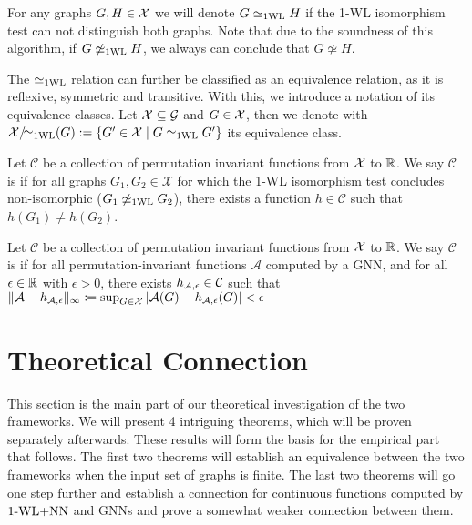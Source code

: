 \begin{definition}[1-WL Relation]
    For any graphs $G,H \in \mathcal{X}$ we will denote $G \simeq_{\text{1WL}} H$ if the 1-WL isomorphism test can not distinguish both graphs. Note that due to the soundness of this algorithm, if $G \not\simeq_{\text{1WL}} H$, we always can conclude that $G \not\simeq H$.
\end{definition}

The $\simeq_{\text{1WL}}$ relation can further be classified as an equivalence relation, as it is reflexive, symmetric and transitive. With this, we introduce a notation of its equivalence classes. Let $\mathcal{X} \subseteq \mathcal{G}$ and $G \in \mathcal{X}$, then we denote with $\mathcal{X}/\!{\simeq_{\text{1WL}}}(G): = \{ G' \in \mathcal{X} \mid G \simeq_{\text{1WL}} G' \}$ its equivalence class.

\begin{definition}[$\wldisc$]
    Let $\mathcal{C}$ be a collection of permutation invariant functions from $\mathcal{X}$ to $\mathbb{R}$. We say $\mathcal{C}$ is \textbf{\wldisc} if for all graphs $G_1, G_2 \in \mathcal{X}$ for which the 1-WL isomorphism test concludes non-isomorphic ($G_1 \not\simeq_{\text{1WL}} G_2$), there exists a function $h \in \mathcal{C}$ such that $h(G_1) \neq h(G_2)$.
\end{definition}

\begin{definition}[$\gapp$]
    Let $\mathcal{C}$ be a collection of permutation invariant functions from $\mathcal{X}$ to $\mathbb{R}$. We say $\mathcal{C}$ is \textbf{\gapp} if for all permutation-invariant functions $\mathcal{A}$ computed by a GNN, and for all $\epsilon \in \mathbb{R}$ with $\epsilon > 0$, there exists $h_{\mathcal{A},\epsilon} \in \mathcal{C}$ such that $\| \mathcal{A} - h_{\mathcal{A},\epsilon} \|_\infty \coloneqq \sup_{G \in \mathcal{X}} |\mathcal{A}(G) - h_{\mathcal{A},\epsilon}(G)| < \epsilon$
\end{definition}

\section{Theoretical Connection}\label{sec:theo_connections}
This section is the main part of our theoretical investigation of the two frameworks. We will present 4 intriguing theorems, which will be proven separately afterwards. These results will form the basis for the empirical part that follows. The first two theorems will establish an equivalence between the two frameworks when the input set of graphs is finite. The last two theorems will go one step further and establish a connection for continuous functions computed by $\text{1-WL+NN}$ and GNNs and prove a somewhat weaker connection between them.

